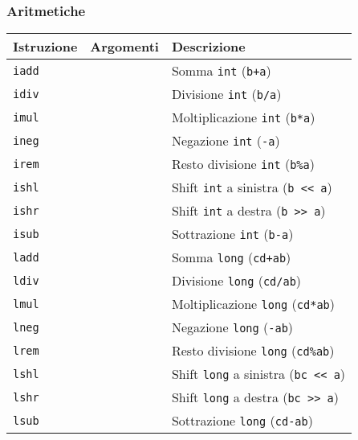 \subsubsection*{Aritmetiche}
\label{sec:aritmetiche}
{\footnotesize
\begin{longtable}{p{2cm} p{2cm} p{6.5cm}}
\toprule
\rowcolor[gray]{0.9}
  \textbf{Istruzione} &
  \textbf{Argomenti} &
  \textbf{Descrizione} \\
\toprule
\endhead
  \texttt{iadd} &
  &
  Somma \texttt{int} (\texttt{b+a})  \\

  \texttt{idiv} &
  &
  Divisione \texttt{int} (\texttt{b/a}) \\

  \texttt{imul} &
  &
  Moltiplicazione \texttt{int} (\texttt{b*a}) \\

  \texttt{ineg} &
  &
  Negazione \texttt{int} (\texttt{-a}) \\

  \texttt{irem} &
  &
  Resto divisione \texttt{int} (\texttt{b\%a}) \\

  \texttt{ishl} &
  &
  Shift \texttt{int} a sinistra (\texttt{b << a}) \\

  \texttt{ishr} &
  &
  Shift \texttt{int} a destra (\texttt{b >> a}) \\

  \texttt{isub} &
  &
  Sottrazione \texttt{int} (\texttt{b-a}) \\

  \texttt{ladd} &
  &
  Somma \texttt{long} (\texttt{cd+ab})  \\

  \texttt{ldiv} &
  &
  Divisione \texttt{long} (\texttt{cd/ab}) \\

  \texttt{lmul} &
  &
  Moltiplicazione \texttt{long} (\texttt{cd*ab}) \\

  \texttt{lneg} &
  &
  Negazione \texttt{long} (\texttt{-ab}) \\

  \texttt{lrem} &
  &
  Resto divisione \texttt{long} (\texttt{cd\%ab}) \\

  \texttt{lshl} &
  &
  Shift \texttt{long} a sinistra (\texttt{bc << a}) \\

  \texttt{lshr} &
  &
  Shift \texttt{long} a destra (\texttt{bc >> a}) \\

  \texttt{lsub} &
  &
  Sottrazione \texttt{long} (\texttt{cd-ab}) \\
\bottomrule
\end{longtable}
} %

